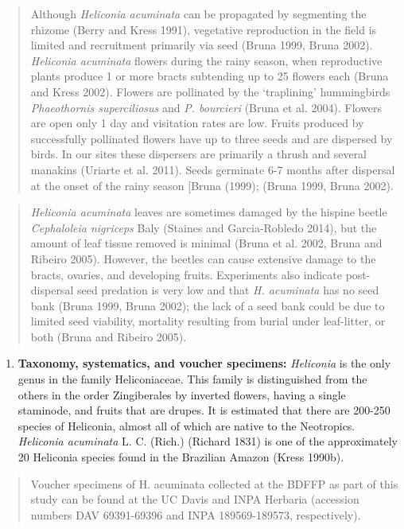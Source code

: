 \documentclass[
  english,
  man]{apa6}
\providecommand{\tightlist}{%
  \setlength{\itemsep}{0pt}\setlength{\parskip}{0pt}}
\begin{document}
\begin{quote}
Although \emph{Heliconia acuminata} can be propagated by segmenting the
rhizome (Berry and Kress 1991), vegetative reproduction in the field
is limited and recruitment primarily via seed (Bruna 1999, Bruna 2002). \emph{Heliconia acuminata} flowers during the rainy season,
when reproductive plants produce 1 or more bracts subtending up to 25
flowers each (Bruna and Kress 2002). Flowers are pollinated by the `traplining'
hummingbirds \emph{Phaeothornis superciliosus} and \emph{P. bourcieri}
(Bruna et al. 2004). Flowers are open only 1 day and visitation rates are
low. Fruits produced by successfully pollinated flowers have up to
three seeds and are dispersed by birds. In our sites these dispersers
are primarily a thrush and several manakins (Uriarte et al. 2011). Seeds
germinate 6-7 months after dispersal at the onset of the rainy season
{[}Bruna (1999); (Bruna 1999, Bruna 2002).
\end{quote}

\begin{quote}
\emph{Heliconia acuminata} leaves are sometimes damaged by the hispine
beetle \emph{Cephaloleia nigriceps} Baly (Staines and Garcia-Robledo 2014), but the amount of
leaf tissue removed is minimal (Bruna et al. 2002, Bruna and Ribeiro 2005). However, the
beetles can cause extensive damage to the bracts, ovaries, and
developing fruits. Experiments also indicate post-dispersal seed
predation is very low and that \emph{H. acuminata} has no seed bank
(Bruna 1999, Bruna 2002); the lack of a seed bank could be due to
limited seed viability, mortality resulting from burial under
leaf-litter, or both (Bruna and Ribeiro 2005).
\end{quote}

\begin{enumerate}
\def\labelenumi{\alph{enumi}.}
\tightlist
\item
  \textbf{Taxonomy, systematics, and voucher specimens:} \emph{Heliconia} is the
  only genus in the family Heliconiaceae. This family is distinguished
  from the others in the order Zingiberales by inverted flowers,
  having a single staminode, and fruits that are drupes. It is
  estimated that there are 200-250 species of Heliconia, almost all of
  which are native to the Neotropics. \emph{Heliconia acuminata} L. C.
  (Rich.) (Richard 1831) is one of the approximately 20 Heliconia
  species found in the Brazilian Amazon (Kress 1990b).
\end{enumerate}

\begin{quote}
Voucher specimens of H. acuminata collected at the BDFFP as part of
this study can be found at the UC Davis and INPA Herbaria (accession
numbers DAV 69391-69396 and INPA 189569-189573, respectively).
\end{quote}
\end{document}
